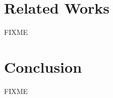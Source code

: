 \documentclass{acm_proc_article-sp}
\begin{document}
\section{Related Works}
FIXME

\section{Conclusion}
FIXME



\end{document}
